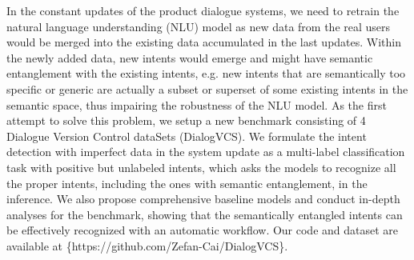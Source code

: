 In the constant updates of the product dialogue systems, we need to retrain the natural language understanding (NLU) model as new data from the real users would be merged into the existing data accumulated in the last updates.  Within the newly added data, new intents would emerge and might have semantic entanglement with the existing intents, e.g. new intents that are semantically too specific or generic are actually a subset or superset of some existing intents in the semantic space, thus impairing the robustness of the NLU model. As the first attempt to solve this problem, we setup a new benchmark consisting of 4 Dialogue Version Control dataSets (DialogVCS). We formulate the intent detection with imperfect data in the system update as a multi-label classification task with positive but unlabeled intents, which asks the models to recognize all the proper intents, including the ones with semantic entanglement, in the inference. We also propose comprehensive baseline models and conduct in-depth analyses for the benchmark, showing that the semantically entangled intents can be effectively recognized with an automatic workflow. Our code and dataset are available at \{https://github.com/Zefan-Cai/DialogVCS\}.
